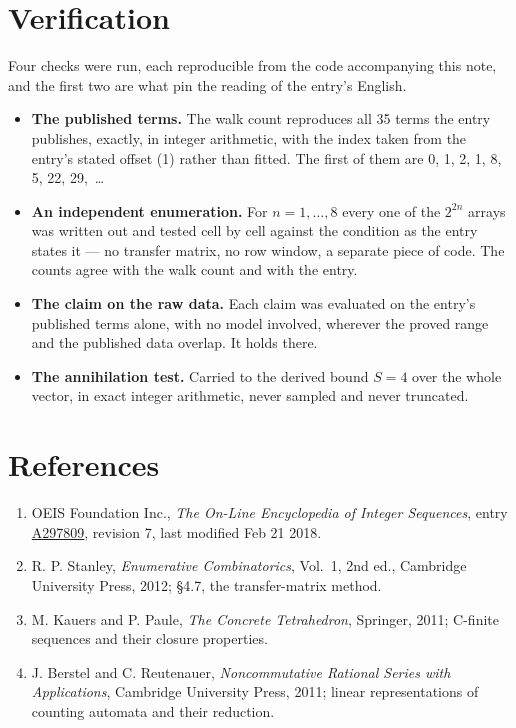 \documentclass[11pt]{article}
\theoremstyle{definition}
\begin{document}
\section{Verification}

Four checks were run, each reproducible from the code accompanying this note, and the first two are what pin the reading of the entry's English.

\begin{itemize}

\item {\bfseries The published terms.} The walk count reproduces all 35 terms the entry publishes, exactly, in integer arithmetic, with the index taken from the entry's stated offset (1) rather than fitted. The first of them are 0, 1, 2, 1, 8, 5, 22, 29,~\dots

\item {\bfseries An independent enumeration.} For $n = 1,\dots,8$ every one of the $2^{2n}$ arrays was written out and tested cell by cell against the condition as the entry states it --- no transfer matrix, no row window, a separate piece of code. The counts agree with the walk count and with the entry.

\item {\bfseries The claim on the raw data.} Each claim was evaluated on the entry's published terms alone, with no model involved, wherever the proved range and the published data overlap. It holds there.

\item {\bfseries The annihilation test.} Carried to the derived bound $S = 4$ over the whole vector, in exact integer arithmetic, never sampled and never truncated.

\end{itemize}

\section{References}

\begin{enumerate}

\item OEIS Foundation Inc., \emph{The On-Line Encyclopedia of Integer Sequences}, entry \href{https://oeis.org/A297809}{A297809}, revision 7, last modified Feb 21 2018.

\item R. P. Stanley, \emph{Enumerative Combinatorics}, Vol.~1, 2nd ed., Cambridge University Press, 2012; \S4.7, the transfer-matrix method.

\item M. Kauers and P. Paule, \emph{The Concrete Tetrahedron}, Springer, 2011; C-finite sequences and their closure properties.

\item J. Berstel and C. Reutenauer, \emph{Noncommutative Rational Series with Applications}, Cambridge University Press, 2011; linear representations of counting automata and their reduction.

\end{enumerate}
\end{document}
